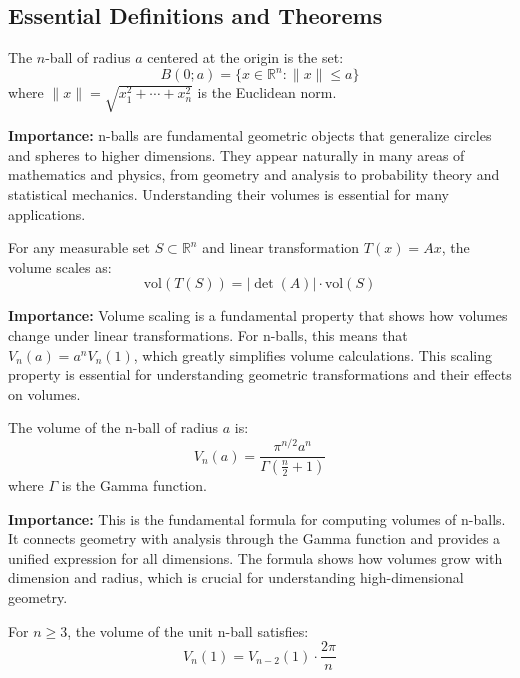 \subsection*{Essential Definitions and Theorems}

\begin{definition}[n-Ball]
The $n$-ball of radius $a$ centered at the origin is the set:
\[B(0; a) = \{x \in \mathbb{R}^n : \|x\| \leq a\}\]
where $\|x\| = \sqrt{x_1^2 + \cdots + x_n^2}$ is the Euclidean norm.
\end{definition}

\noindent\textbf{Importance:} n-balls are fundamental geometric objects that generalize circles and spheres to higher dimensions. They appear naturally in many areas of mathematics and physics, from geometry and analysis to probability theory and statistical mechanics. Understanding their volumes is essential for many applications.



\begin{definition}
For any measurable set $S \subset \mathbb{R}^n$ and linear transformation $T(x) = Ax$, the volume scales as:
\[\text{vol}(T(S)) = |\det(A)| \cdot \text{vol}(S)\]
\end{definition}

\noindent\textbf{Importance:} Volume scaling is a fundamental property that shows how volumes change under linear transformations. For n-balls, this means that $V_n(a) = a^n V_n(1)$, which greatly simplifies volume calculations. This scaling property is essential for understanding geometric transformations and their effects on volumes.



\begin{theorem}
The volume of the n-ball of radius $a$ is:
\[V_n(a) = \frac{\pi^{n/2} a^n}{\Gamma(\frac{n}{2} + 1)}\]
where $\Gamma$ is the Gamma function.
\end{theorem}

\noindent\textbf{Importance:} This is the fundamental formula for computing volumes of n-balls. It connects geometry with analysis through the Gamma function and provides a unified expression for all dimensions. The formula shows how volumes grow with dimension and radius, which is crucial for understanding high-dimensional geometry.



\begin{theorem}
For $n \geq 3$, the volume of the unit n-ball satisfies:
\[V_n(1) = V_{n-2}(1) \cdot \frac{2\pi}{n}\]
\end{theorem}

